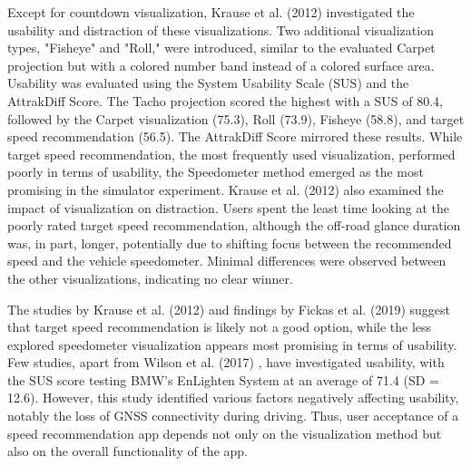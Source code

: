 Except for countdown visualization, Krause et al. (2012) \cite{krause_traffic_2012} investigated the usability and distraction of these visualizations. Two additional visualization types, "Fisheye" and "Roll," were introduced, similar to the evaluated Carpet projection but with a colored number band instead of a colored surface area. Usability was evaluated using the System Usability Scale (SUS) and the AttrakDiff Score. The Tacho projection scored the highest with a SUS of 80.4, followed by the Carpet visualization (75.3), Roll (73.9), Fisheye (58.8), and target speed recommendation (56.5). The AttrakDiff Score mirrored these results. While target speed recommendation, the most frequently used visualization, performed poorly in terms of usability, the Speedometer method emerged as the most promising in the simulator experiment. Krause et al. (2012) \cite{krause_traffic_2012} also examined the impact of visualization on distraction. Users spent the least time looking at the poorly rated target speed recommendation, although the off-road glance duration was, in part, longer, potentially due to shifting focus between the recommended speed and the vehicle speedometer. Minimal differences were observed between the other visualizations, indicating no clear winner.

The studies by Krause et al. (2012) \cite{krause_traffic_2012} and findings by Fickas et al. (2019) \cite{fickas_fast_2019} suggest that target speed recommendation is likely not a good option, while the less explored speedometer visualization appears most promising in terms of usability. Few studies, apart from Wilson et al. (2017) \cite{wilson_driver_2017}, have investigated usability, with the SUS score testing BMW's EnLighten System at an average of 71.4 (SD = 12.6). However, this study identified various factors negatively affecting usability, notably the loss of GNSS connectivity during driving. Thus, user acceptance of a speed recommendation app depends not only on the visualization method but also on the overall functionality of the app.

